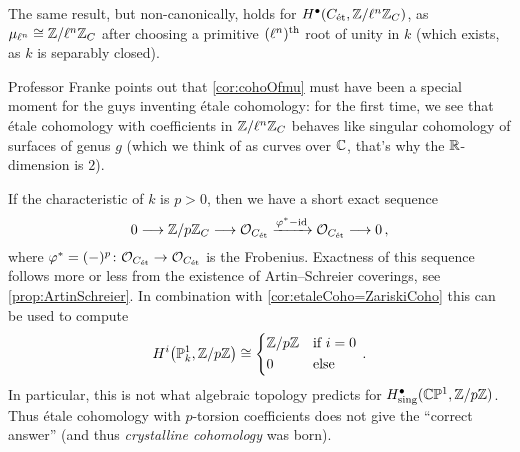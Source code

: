 \begin{rem}\label{rem:AlgTopo}
	\begin{alphanumerate}
		\item The same result, but non-canonically, holds for $H^\bullet(C_{\mathrm{\acute{e}t}},\mathbb{Z}/\ell^n\mathbb{Z}_C)$, as $\mu_{\ell^n}\cong \mathbb{Z}/\ell^n\mathbb{Z}_C$ after choosing a primitive $(\ell^n)^{\text{th}}$ root of unity in $k$ (which exists, as $k$ is separably closed).
		\item Professor Franke points out that \cref{cor:cohoOfmu} must have been a special moment for the guys inventing étale cohomology: for the first time, we see that étale cohomology with coefficients in $\mathbb{Z}/\ell^n\mathbb{Z}_C$ behaves like singular cohomology of surfaces of genus $g$ (which we think of as curves over $\mathbb{C}$, that's why the $\mathbb{R}$-dimension is $2$).
		\item If the characteristic of $k$ is $p>0$, then we have a short exact sequence
		\begin{equation*}
			0\morphism \IZ/p\IZ_C\morphism \Oo_{C_\et}\xrightarrow{\phi^*-\id}\Oo_{C_\et}\morphism 0\,,
		\end{equation*}
		where $\phi^*=(-)^p\colon \Oo_{C_\et}\morphism \Oo_{C_\et}$ is the Frobenius. Exactness of this sequence follows more or less from the existence of Artin--Schreier coverings, see \cref{prop:ArtinSchreier}. In combination with \cref{cor:etaleCoho=ZariskiCoho} this can be used to compute
		\begin{equation*}
			H^i\big(\IP_k^1,\IZ/p\IZ\big)\cong \begin{cases*}
				\IZ/p\IZ & if $i=0$\\
				0 & else
			\end{cases*}\,.
		\end{equation*}
		In particular, this is not what algebraic topology predicts for $H_\mathrm{sing}^\bullet(\mathbb{C}\mathbb{P}^1,\mathbb{Z}/p\mathbb{Z})$. Thus étale cohomology with $p$-torsion coefficients does not give the \enquote{correct answer} (and thus \emph{crystalline cohomology} was born).
	\end{alphanumerate}
\end{rem}
